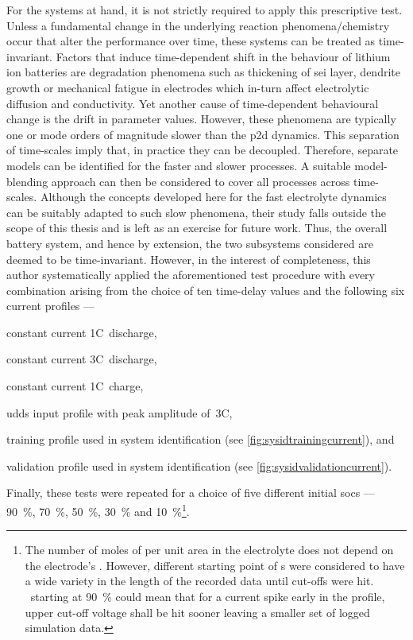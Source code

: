 For the systems at hand, it is  not strictly required to apply this prescriptive
test. Unless a fundamental change in the underlying reaction phenomena/chemistry
occur that  alter the  performance over  time, these systems  can be  treated as
time-invariant. Factors  that induce  time-dependent shift  in the  behaviour of
lithium ion batteries are degradation  phenomena such as thickening of \gls{sei}
layer, dendrite growth or mechanical  fatigue in electrodes which in-turn affect
electrolytic  diffusion and  conductivity. Yet  another cause  of time-dependent
behavioural change  is the drift  in parameter values. However,  these phenomena
are  typically  one or  mode  orders  of  magnitude  slower than  the  \gls{p2d}
dynamics. This separation  of time-scales imply that, in
practice they can be decoupled. Therefore, separate models can be identified for
the faster and slower processes. A  suitable model-blending approach can then be
considered  to cover  all processes  across time-scales.  Although the  concepts
developed here for the fast electrolyte dynamics can be suitably adapted to such
slow phenomena, their study  falls outside the scope of this  thesis and is left
as an exercise for  future work. Thus, the overall battery  system, and hence by
extension,  the  two subsystems  considered  are  deemed to  be  time-invariant.
However, in the interest of completeness, this author systematically applied the
aforementioned test procedure with every  combination arising from the choice of
ten time-delay values and the following six current profiles ---
\begin{enumerate*}[label=\emph{\alph*})]
    \item constant current 1C~discharge,
    \item constant current 3C~discharge,
    \item constant current 1C~charge,
    \item \gls{udds} input profile with peak amplitude of~3C,
    \item training profile used in system identification (see \cref{fig:sysidtrainingcurrent}), and
    \item validation profile used in system identification (see \cref{fig:sysidvalidationcurrent}).
\end{enumerate*}
Finally,  these tests  were  repeated for  a choice  of  five different  initial
\glspl{soc}   ---   \SI{90}{\percent},   \SI{70}{\percent},   \SI{50}{\percent},
\SI{30}{\percent}  and \SI{10}{\percent}\footnote{\label{fn:socstart}The  number
of  moles  of   per  unit  area  in  the  electrolyte does  not  depend
on  the  electrode's .  However,  different  starting point  of
s were considered  to have a wide variety in  the length of the
recorded  data until  cut-offs  were hit.  \eg~starting at  \SI{90}{\percent}
 could  mean that  for a  current spike  early in  the profile,
upper  cut-off voltage  shall be  hit  sooner leaving  a smaller  set of  logged
simulation data.}.

